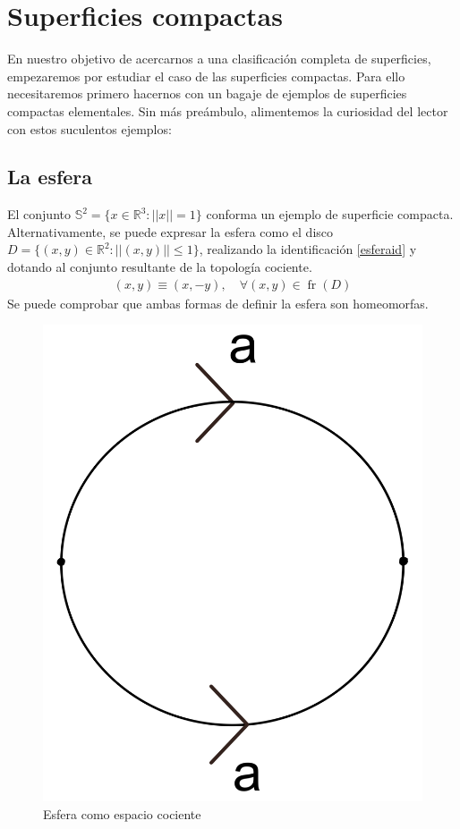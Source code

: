 \documentclass[a4paper,11pt,spanish, twoside, leqno]{tfg-uam}
\DeclareMathOperator{\frontera}{fr}
\theoremstyle{definition}
\begin{document}
\section{Superficies compactas}

En nuestro objetivo de acercarnos a una clasificación  completa de superficies, empezaremos por estudiar el caso de las superficies compactas. Para ello necesitaremos primero hacernos con un bagaje de ejemplos de superficies compactas elementales. Sin más preámbulo, alimentemos la curiosidad del lector con estos suculentos ejemplos:

\subsection*{La esfera}
El conjunto $ \mathbb{S}^2 = \{x\in \mathbb{R}^3: ||x||=1 \} $ conforma un ejemplo de superficie compacta. Alternativamente, se puede expresar la esfera como el disco $ D = \{(x,y)\in\mathbb{R}^2: ||(x,y)||\leq1 \} $, realizando la identificación  \ref{esferaid} y dotando al conjunto resultante de la topología cociente.
\begin{align}\label{esferaid}
	(x,y)\equiv(x,-y),\quad\forall(x,y)\in \frontera(D)
\end{align}
Se puede comprobar que ambas formas de definir la esfera son homeomorfas. 

\begin{figure}[h!]
	\centering
	\includegraphics[width=0.15\linewidth]{imagenes/esfera_plana.png}
	\caption{Esfera como espacio cociente}
	\label{fig:esfera expresion canonica}
\end{figure} 
\end{document}
